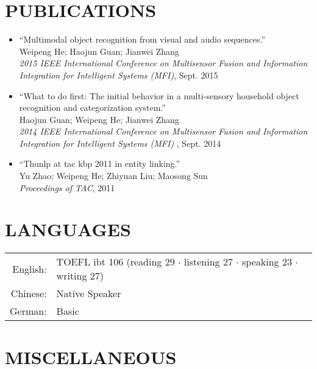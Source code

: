 \documentclass[a4paper,11pt]{article} %
\begin{document}
\section{PUBLICATIONS}
\begin{itemize}
  \item ``Multimodal object recognition from visual and audio sequences.'' \\
    Weipeng He; Haojun Guan; Jianwei Zhang \\
    \textit{2015 IEEE International Conference on Multisensor Fusion and Information Integration for Intelligent Systems (MFI)}, Sept. 2015 

  \item ``What to do first: The initial behavior in a multi-sensory household object recognition and categorization system.'' \\
    Haojun Guan; Weipeng He; Jianwei Zhang \\
    \textit{2014 IEEE International Conference on Multisensor Fusion and Information Integration for Intelligent Systems (MFI)} , Sept. 2014

  \item ``Thunlp at tac kbp 2011 in entity linking.'' \\
    Yu Zhao; Weipeng He; Zhiyuan Liu; Maosong Sun \\
    \textit{Proceedings of TAC}, 2011
\end{itemize}


\section{LANGUAGES}

\begin{tabular}{rl}
  English: & TOEFL ibt 106 (reading 29 $\cdotp$ listening 27 $\cdotp$ speaking 23 $\cdotp$ writing 27) \\
  Chinese: & Native Speaker \\
  German: & Basic \\
\end{tabular}

\section{MISCELLANEOUS}
\end{document}
